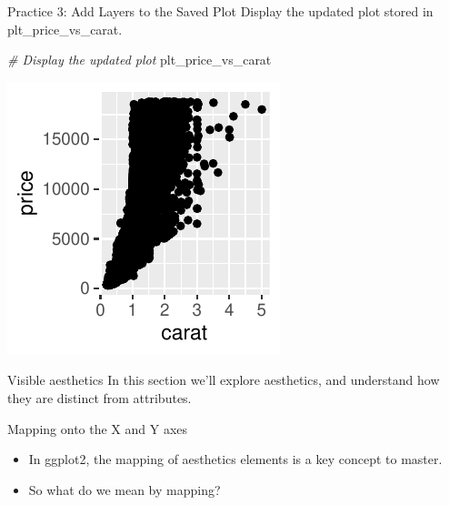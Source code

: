 \documentclass[
  ignorenonframetext,
]{beamer}
\newenvironment{Shaded}{\begin{snugshade}}{\end{snugshade}}
\newcommand{\CommentTok}[1]{\textcolor[rgb]{0.56,0.35,0.01}{\textit{#1}}}
\newcommand{\NormalTok}[1]{#1}
\begin{document}
\begin{frame}[fragile]{Practice 3: Add Layers to the Saved Plot}
\label{practice-3-add-layers-to-the-saved-plot-1}
Display the updated plot stored in plt\_price\_vs\_carat.


\begin{Shaded}
\begin{Highlighting}[]
\CommentTok{\# Display the updated plot}
\NormalTok{plt\_price\_vs\_carat}
\end{Highlighting}
\end{Shaded}

\begin{center}\includegraphics[width=0.5\linewidth]{Figs/unnamed-chunk-9-1} \end{center}
\end{frame}

\begin{frame}{Visible aesthetics}
\label{visible-aesthetics}
In this section we'll explore aesthetics, and understand how they are
distinct from attributes.
\end{frame}

\begin{frame}{Mapping onto the X and Y axes}
\label{mapping-onto-the-x-and-y-axes}
\begin{itemize}
\item
  In ggplot2, the mapping of aesthetics elements is a key concept to
  master.
\item
  So what do we mean by mapping?
\end{itemize}
\end{frame}
\end{document}
